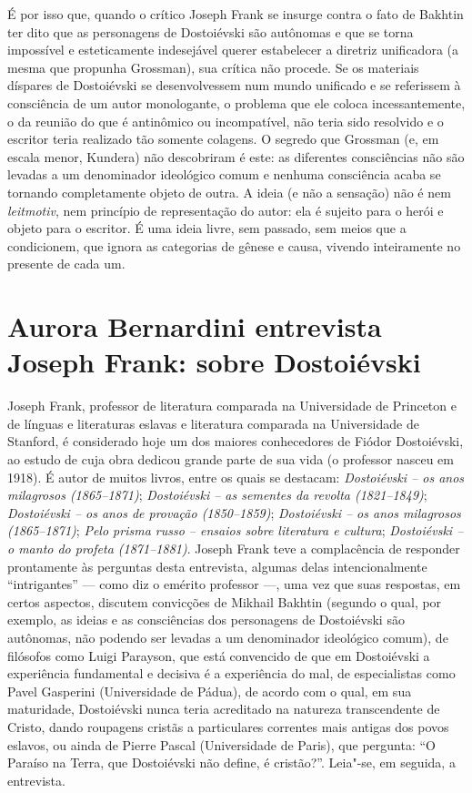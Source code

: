 {{É por isso que, quando o crítico Joseph Frank se insurge contra o fato
de Bakhtin ter dito que as personagens de Dostoiévski são autônomas e
que se torna impossível e esteticamente indesejável querer estabelecer a
diretriz unificadora (a mesma que propunha Grossman), sua crítica não
procede. Se os materiais díspares de Dostoiévski se desenvolvessem num
mundo unificado e se referissem à consciência de um autor monologante, o
problema que ele coloca incessantemente, o da reunião do que é
antinômico ou incompatível, não teria sido resolvido e o escritor teria
realizado tão somente colagens. O segredo que Grossman (e, em escala
menor, Kundera) não descobriram é este: as diferentes consciências não
são levadas a um denominador ideológico comum e nenhuma consciência
acaba se tornando completamente objeto de outra. A ideia (e não a
sensação) não é nem \emph{leitmotiv}, nem princípio de representação do
autor: ela é sujeito para o herói e objeto para o escritor. É uma ideia
livre, sem passado, sem meios que a condicionem, que ignora as
categorias de gênese e causa, vivendo inteiramente no presente de cada
um.

\chapter*{Aurora Bernardini entrevista Joseph Frank: sobre Dostoiévski}





Joseph Frank, professor de literatura comparada na Universidade de
Princeton e de línguas e literaturas eslavas e literatura comparada na
Universidade de Stanford, é considerado hoje um dos maiores conhecedores
de Fiódor Dostoiévski, ao estudo de cuja obra dedicou grande parte de
sua vida (o professor nasceu em 1918). É autor de muitos livros, entre
os quais se destacam: \emph{Dostoiévski -- os anos milagrosos (1865--1871)}; \emph{Dostoiévski -- as sementes da revolta (1821--1849)}; \emph{Dostoiévski -- os anos de provação
(1850--1859)}; \emph{Dostoiévski -- os anos
milagrosos (1865--1871)}; \emph{Pelo prisma russo -- ensaios sobre literatura e cultura}; \emph{Dostoiévski -- o manto do
profeta (1871--1881)}. Joseph
Frank teve a complacência de responder prontamente às perguntas desta
entrevista, algumas delas intencionalmente ``intrigantes'' --- como diz o
emérito professor ---, uma vez que suas respostas, em certos aspectos,
discutem convicções de Mikhail Bakhtin (segundo o qual, por exemplo, as
ideias e as consciências dos personagens de Dostoiévski são autônomas,
não podendo ser levadas a um denominador ideológico comum), de filósofos
como Luigi Parayson, que está convencido de que em Dostoiévski a
experiência fundamental e decisiva é a experiência do mal, de
especialistas como Pavel Gasperini (Universidade de Pádua), de acordo
com o qual, em sua maturidade, Dostoiévski nunca teria acreditado na
natureza transcendente de Cristo, dando roupagens cristãs a particulares
correntes mais antigas dos povos eslavos, ou ainda de Pierre Pascal
(Universidade de Paris), que pergunta: ``O Paraíso na Terra, que
Dostoiévski não define, é cristão?''. Leia"-se, em seguida, a entrevista.

}}
